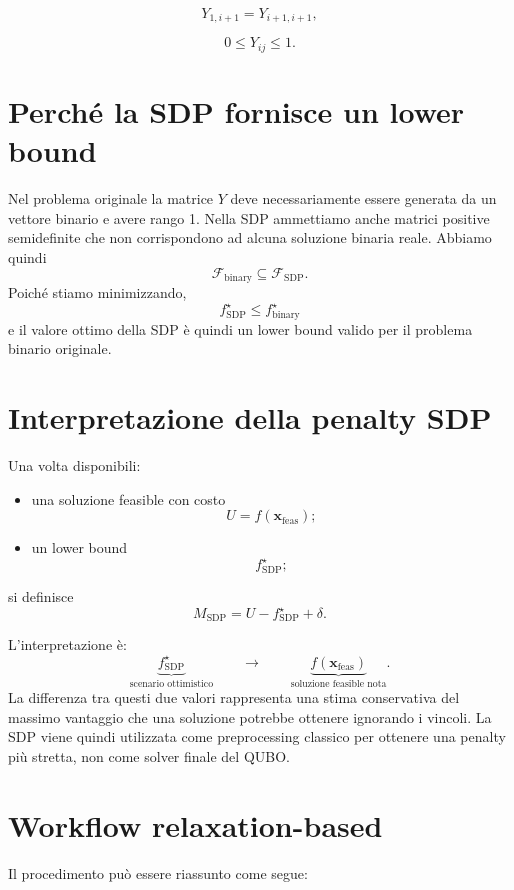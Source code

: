 \documentclass[11pt,a4paper]{report}
\begin{document}
\[
Y_{1,i+1}
=
Y_{i+1,i+1},
\]

\[
0\leq Y_{ij}\leq1.
\]

\section{Perché la SDP fornisce un lower bound}
Nel problema originale la matrice $Y$ deve necessariamente essere
generata da un vettore binario e avere rango 1. Nella SDP ammettiamo anche matrici positive semidefinite che non
corrispondono ad alcuna soluzione binaria reale. \newline
Abbiamo quindi
\[
\mathcal F_{\mathrm{binary}}
\subseteq
\mathcal F_{\mathrm{SDP}}.
\]
Poiché stiamo minimizzando,
\[
\boxed{
f^\star_{\mathrm{SDP}}
\leq
f^\star_{\mathrm{binary}}
}
\]
e il valore ottimo della SDP è quindi un lower bound valido per il
problema binario originale.

\section{Interpretazione della penalty SDP}
Una volta disponibili:
\begin{itemize}
    \item una soluzione feasible con costo
    \[
    U=f(\mathbf x_{\mathrm{feas}});
    \]
    \item un lower bound
    \[
    f^\star_{\mathrm{SDP}};
    \]
\end{itemize}

si definisce
\[
\boxed{
M_{\mathrm{SDP}}
=
U
-
f^\star_{\mathrm{SDP}}
+
\delta.
}
\]

L'interpretazione è:
\[
\underbrace{
f^\star_{\mathrm{SDP}}
}_{\text{scenario ottimistico}}
\qquad
\longrightarrow
\qquad
\underbrace{
f(\mathbf x_{\mathrm{feas}})
}_{\text{soluzione feasible nota}}.
\]
La differenza tra questi due valori rappresenta una stima conservativa
del massimo vantaggio che una soluzione potrebbe ottenere ignorando i
vincoli. \newline
La SDP viene quindi utilizzata come preprocessing classico per ottenere
una penalty più stretta, non come solver finale del QUBO.

\section{Workflow relaxation-based}

Il procedimento può essere riassunto come segue:
\end{document}
